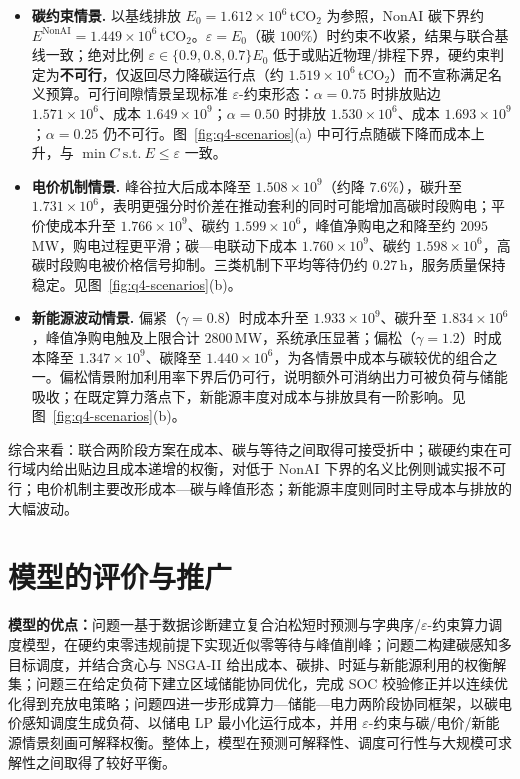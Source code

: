 \documentclass[UTF8,a4paper,zihao=-4]{ctexart}
\begin{document}
\begin{itemize}
  \item \textbf{碳约束情景.}
  以基线排放 \(E_0=1.612\times 10^6\)\,tCO\(_2\) 为参照，NonAI 碳下界约 \(E^{\mathrm{NonAI}}=1.449\times 10^6\)\,tCO\(_2\)。\(\varepsilon=E_0\)（碳 \(100\%\)）时约束不收紧，结果与联合基线一致；绝对比例 \(\varepsilon\in\{0.9,0.8,0.7\}E_0\) 低于或贴近物理/排程下界，硬约束判定为\textbf{不可行}，仅返回尽力降碳运行点（约 \(1.519\times 10^6\)\,tCO\(_2\)）而不宣称满足名义预算。可行间隙情景呈现标准 \(\varepsilon\)-约束形态：\(\alpha=0.75\) 时排放贴边 \(1.571\times 10^6\)、成本 \(1.649\times 10^9\)；\(\alpha=0.50\) 时排放 \(1.530\times 10^6\)、成本 \(1.693\times 10^9\)；\(\alpha=0.25\) 仍不可行。图~\ref{fig:q4-scenarios}(a) 中可行点随碳下降而成本上升，与 \(\min C\ \mathrm{s.t.}\ E\le\varepsilon\) 一致。

  \item \textbf{电价机制情景.}
  峰谷拉大后成本降至 \(1.508\times 10^9\)（约降 \(7.6\%\)），碳升至 \(1.731\times 10^6\)，表明更强分时价差在推动套利的同时可能增加高碳时段购电；平价使成本升至 \(1.766\times 10^9\)、碳约 \(1.599\times 10^6\)，峰值净购电之和降至约 \(2095\)\,MW，购电过程更平滑；碳—电联动下成本 \(1.760\times 10^9\)、碳约 \(1.598\times 10^6\)，高碳时段购电被价格信号抑制。三类机制下平均等待仍约 \(0.27\)\,h，服务质量保持稳定。见图~\ref{fig:q4-scenarios}(b)。

  \item \textbf{新能源波动情景.}
  偏紧（\(\gamma=0.8\)）时成本升至 \(1.933\times 10^9\)、碳升至 \(1.834\times 10^6\)，峰值净购电触及上限合计 \(2800\)\,MW，系统承压显著；偏松（\(\gamma=1.2\)）时成本降至 \(1.347\times 10^9\)、碳降至 \(1.440\times 10^6\)，为各情景中成本与碳较优的组合之一。偏松情景附加利用率下界后仍可行，说明额外可消纳出力可被负荷与储能吸收；在既定算力落点下，新能源丰度对成本与排放具有一阶影响。见图~\ref{fig:q4-scenarios}(b)。
\end{itemize}

综合来看：联合两阶段方案在成本、碳与等待之间取得可接受折中；碳硬约束在可行域内给出贴边且成本递增的权衡，对低于 NonAI 下界的名义比例则诚实报不可行；电价机制主要改形成本—碳与峰值形态；新能源丰度则同时主导成本与排放的大幅波动。

\section{模型的评价与推广}

\textbf{\qquad 模型的优点：}问题一基于数据诊断建立复合泊松短时预测与字典序/$\varepsilon$-约束算力调度模型，在硬约束零违规前提下实现近似零等待与峰值削峰；问题二构建碳感知多目标调度，并结合贪心与 NSGA-II 给出成本、碳排、时延与新能源利用的权衡解集；问题三在给定负荷下建立区域储能协同优化，完成 SOC 校验修正并以连续优化得到充放电策略；问题四进一步形成算力—储能—电力两阶段协同框架，以碳电价感知调度生成负荷、以储电 LP 最小化运行成本，并用 $\varepsilon$-约束与碳/电价/新能源情景刻画可解释权衡。整体上，模型在预测可解释性、调度可行性与大规模可求解性之间取得了较好平衡。
\end{document}

